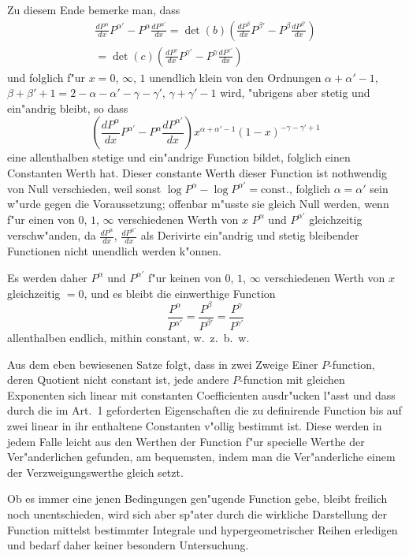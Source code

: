 \documentclass[12pt,a4paper]{article}
\begin{document}
Zu diesem Ende bemerke man, dass
\begin{multline*}
\frac{dP^{\alpha}}{dx} P^{\alpha'} - P^{\alpha} \frac{dP^{\alpha'}}{dx} = \det(b) \left(\frac{dP^{\beta}}{dx} P^{\beta'} - P^{\beta} \frac{dP^{\beta'}}{dx}\right) \\
= \det(c) \left(\frac{dP^{\gamma}}{dx} P^{\gamma'} - P^{\gamma} \frac{dP^{\gamma'}}{dx}\right)
\end{multline*}
und folglich f{"u}r $x = 0$, $\infty$, $1$ unendlich klein von den Ordnungen $\alpha + \alpha' - 1$, $\beta + \beta' + 1 = 2 - \alpha - \alpha' - \gamma - \gamma'$, $\gamma + \gamma' - 1$ wird, {"u}brigens aber stetig und ein{"a}ndrig bleibt, so dass
\[
\left(\frac{dP^{\alpha}}{dx} P^{\alpha'} - P^{\alpha} \frac{dP^{\alpha'}}{dx}\right) x^{\alpha+\alpha'-1} (1-x)^{-\gamma-\gamma'+1}
\]
eine allenthalben stetige und ein{"a}ndrige Function bildet, folglich einen Constanten Werth hat. Dieser constante Werth dieser Function ist nothwendig von Null verschieden, weil sonst $\log P^{\alpha} - \log P^{\alpha'} = \text{const.}$, folglich $\alpha = \alpha'$ sein w{"u}rde gegen die Voraussetzung; offenbar m{"u}sste sie gleich Null werden, wenn f{"u}r einen von $0$, $1$, $\infty$ verschiedenen Werth von $x$ $P^{\alpha}$ und $P^{\alpha'}$ gleichzeitig verschw{"a}nden, da $\frac{dP^{\alpha}}{dx}$, $\frac{dP^{\alpha'}}{dx}$ als Derivirte ein{"a}ndrig und stetig bleibender Functionen nicht unendlich werden k{"o}nnen.

Es werden daher $P^{\alpha}$ und $P^{\alpha'}$ f{"u}r keinen von $0$, $1$, $\infty$ verschiedenen Werth von $x$ gleichzeitig $= 0$, und es bleibt die einwerthige Function
\[
\frac{P^{\alpha}}{P^{\alpha'}} = \frac{P^{\beta}}{P^{\beta'}} = \frac{P^{\gamma}}{P^{\gamma'}}
\]
allenthalben endlich, mithin constant, w.~z.~b.~w.

Aus dem eben bewiesenen Satze folgt, dass in zwei Zweige Einer $P$-function, deren Quotient nicht constant ist, jede andere $P$-function mit gleichen Exponenten sich linear mit constanten Coefficienten ausdr{"u}cken l{"a}sst und dass durch die im Art.~1 geforderten Eigenschaften die zu definirende Function bis auf zwei linear in ihr enthaltene Constanten v{"o}llig bestimmt ist. Diese werden in jedem Falle leicht aus den Werthen der Function f{"u}r specielle Werthe der Ver{"a}nderlichen gefunden, am bequemsten, indem man die Ver{"a}nderliche einem der Verzweigungswerthe gleich setzt.

Ob es immer eine jenen Bedingungen gen{"u}gende Function gebe, bleibt freilich noch unentschieden, wird sich aber sp{"a}ter durch die wirkliche Darstellung der Function mittelst bestimmter Integrale und hypergeometrischer Reihen erledigen und bedarf daher keiner besondern Untersuchung.
\end{document}
